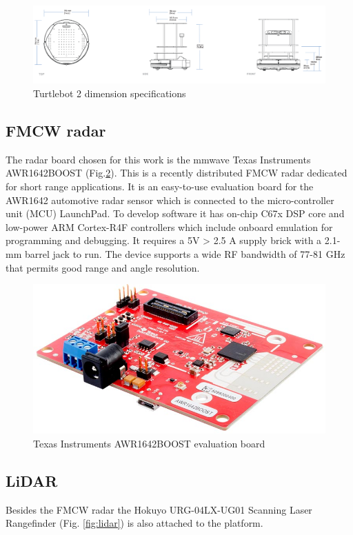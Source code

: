 \begin{figure}[h] 
\centerline{\includegraphics [width=1.0 \textwidth]{imgs/chapter4/tspecs.png}}
\caption{Turtlebot 2 dimension specifications}
\label{fig::t2specs}
\end{figure}


\subsection{FMCW radar}
The radar board chosen for this work is the mmwave Texas Instruments AWR1642BOOST (Fig.\ref{fig:awr}). This is a recently distributed \ac{FMCW} radar dedicated for short range applications. It is an easy-to-use evaluation board for the AWR1642 automotive radar sensor which is connected to the micro-controller unit (MCU) LaunchPad. To develop software it has  on-chip C67x DSP core and low-power ARM Cortex-R4F controllers which include onboard emulation for programming and debugging.
It requires a 5V > 2.5 A supply brick with a 2.1-mm barrel jack to run.
The device supports a wide RF bandwidth of 77-81 GHz that permits good range and angle resolution.

\begin{figure}[h] 
\centerline{\includegraphics [width=0.5 \textwidth]{imgs/chapter4/awr1642.jpg}}
\caption{Texas Instruments AWR1642BOOST evaluation board}
\label{fig:awr}
\end{figure}

\subsection{LiDAR}
Besides the \ac{FMCW} \ac{radar} the Hokuyo URG-04LX-UG01 Scanning Laser Rangefinder (Fig. \ref{fig:lidar}) is also attached to the platform.

